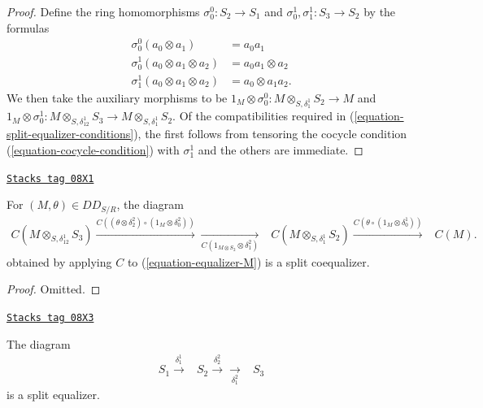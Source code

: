 \begin{proof}
Define the ring homomorphisms $\sigma^0_0: S_2 \to S_1$ and $\sigma_0^1,
\sigma_1^1: S_3 \to S_2$ by the formulas
\begin{align*}
\sigma^0_0 (a_0 \otimes a_1) & = a_0a_1 \\
\sigma^1_0 (a_0 \otimes a_1 \otimes a_2) & = a_0a_1 \otimes a_2 \\
\sigma^1_1 (a_0 \otimes a_1 \otimes a_2) & = a_0 \otimes a_1a_2.
\end{align*}
We then take the auxiliary morphisms to be
$1_M \otimes \sigma_0^0: M \otimes_{S, \delta_1^1} S_2 \to M$
and $1_M \otimes \sigma_0^1: M \otimes_{S,\delta_{12}^1} S_3 \to M \otimes_{S,
\delta_1^1} S_2$.
Of the compatibilities required in (\ref{equation-split-equalizer-conditions}),
the first follows from tensoring the cocycle condition
(\ref{equation-cocycle-condition}) with $\sigma_1^1$
and the others are immediate.
\end{proof}

\begin{lemma}[Equalizer CM]
\label{descent-lemma-equalizer-CM}
\href{https://stacks.math.columbia.edu/tag/08X1}{\texttt{Stacks tag 08X1}}

For $(M, \theta) \in DD_{S/R}$, the diagram
\begin{equation}
\label{equation-coequalizer-CM}
\begin{array}{ccc}C(M \otimes_{S, \delta_{12}^1} S_3)
\overset{C((\theta \otimes \delta_2^2) \circ (1_M \otimes \delta^2_0))}{\longrightarrow}\underset{C(1_{M \otimes S_2} \otimes \delta^2_1)}{\longrightarrow} & C(M \otimes_{S, \delta_1^1} S_2 )
\overset{C(\theta \circ (1_M \otimes \delta_0^1))}{\longrightarrow} & C(M).\end{array}
\end{equation}
obtained by applying $C$ to (\ref{equation-equalizer-M}) is a split
coequalizer.
\end{lemma}

\begin{proof}
Omitted.
\end{proof}

\begin{lemma}[Equalizer S]
\label{descent-lemma-equalizer-S}
\href{https://stacks.math.columbia.edu/tag/08X3}{\texttt{Stacks tag 08X3}}

The diagram
\begin{equation}
\label{equation-equalizer-S}
\begin{array}{ccc}S_1 \overset{\delta^1_1}{\longrightarrow} & S_2 \overset{\delta^2_2}{\longrightarrow}\underset{\delta^2_1}{\longrightarrow} & S_3\end{array}
\end{equation}
is a split equalizer.
\end{lemma}

